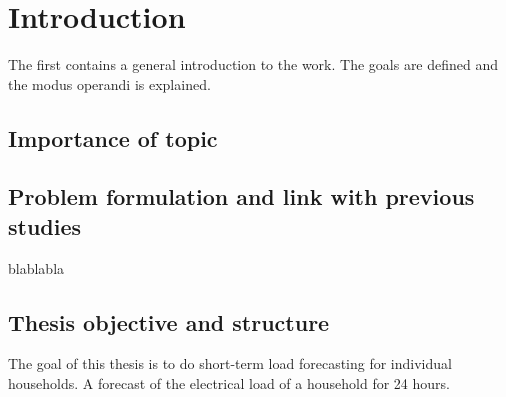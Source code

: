 \chapter{Introduction}
\label{cha:intro}
The first contains a general introduction to the work. The goals are
defined and the modus operandi is explained.

\section{Importance of topic}

\section{Problem formulation and link with previous studies}
blablabla

\section{Thesis objective and structure}
The goal of this thesis is to do short-term load forecasting for individual households. A forecast of the electrical load of a household for 24 hours. 


